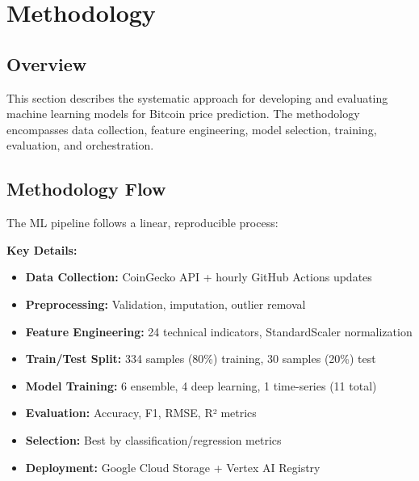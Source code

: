 \section{Methodology}

\subsection{Overview}

This section describes the systematic approach for developing and evaluating machine learning models for Bitcoin price prediction. The methodology encompasses data collection, feature engineering, model selection, training, evaluation, and orchestration.

\subsection{Methodology Flow}

The ML pipeline follows a linear, reproducible process:

\begin{center}
\end{center}

\noindent
\textbf{Key Details:}
\begin{itemize}
    \item \textbf{Data Collection:} CoinGecko API + hourly GitHub Actions updates
    \item \textbf{Preprocessing:} Validation, imputation, outlier removal
    \item \textbf{Feature Engineering:} 24 technical indicators, StandardScaler normalization
    \item \textbf{Train/Test Split:} 334 samples (80\%) training, 30 samples (20\%) test
    \item \textbf{Model Training:} 6 ensemble, 4 deep learning, 1 time-series (11 total)
    \item \textbf{Evaluation:} Accuracy, F1, RMSE, R² metrics
    \item \textbf{Selection:} Best by classification/regression metrics
    \item \textbf{Deployment:} Google Cloud Storage + Vertex AI Registry
\end{itemize}

